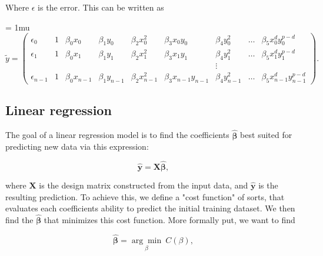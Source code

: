 Where $\epsilon$ is the error. This can be written as

\begin{frame}
\footnotesize
\setlength{\arraycolsep}{2.5pt} %
\medmuskip = 1mu %
\begin{equation*}
  \tilde{y}=  \begin{pmatrix}
    \epsilon_0 & 1 & \beta_0 x_0 &  \beta_1 y_0 &  \beta_2 x_0^2 &  \beta_3 x_0y_0 &  \beta_4 y_0^2 & \ldots &  \beta_5 x_0^d y_0^{p-d}\\
    \epsilon_1 & 1 & \beta_0 x_1 &  \beta_1 y_1 &  \beta_2 x_1^2 &  \beta_3 x_1y_1 &  \beta_4 y_1^2 & \ldots &  \beta_5 x_1^d y_1^{p-d}\\
     & &  &  &  &  & \vdots & \\
    \epsilon_{n-1} & 1 & \beta_0 x_{n-1} & \beta_1 y_{n-1} & \beta_2 x_{n-1}^2 & \beta_3 x_{n-1}y_{n-1} & \beta_4 y_{n-1}^2 & \ldots & \beta_5 x_{n-1}^d y_{n-1}^{p-d}
 \end{pmatrix}.
\end{equation*}
\end{frame}

\subsection{Linear regression}
The goal of a linear regression model is to find the coefficients $\hat{\mathbf \beta}$ best suited for predicting new data via this expression:

\begin{equation*}
  \hat{\mathbf y} = \mathbf X\hat{\mathbf \beta},
\end{equation*}

where $\mathbf X$ is the design matrix constructed from the input data, and $\hat{\mathbf y}$ is the resulting prediction. To achieve this, we define a "cost function" of sorts, that evaluates each coefficients ability to predict the initial training dataset. We then find the $\hat{\mathbf \beta}$ that minimizes this cost function. More formally put, we want to find

\begin{equation}
  \hat{\mathbf \beta} = \underset{\beta}{\arg \min}\ C(\beta),
\end{equation}

